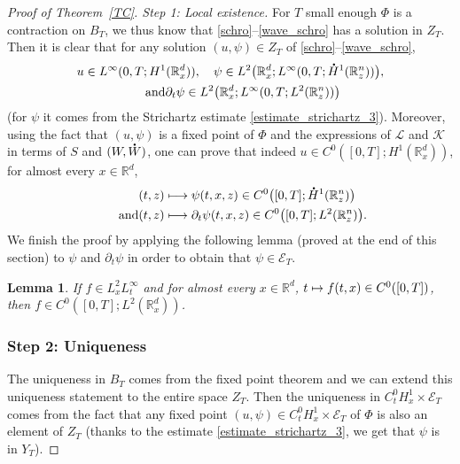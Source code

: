 \documentclass[10pt]{amsart}
\newcommand\mto{\mathchoice{\longmapsto}{\mapsto}{\mapsto}{\mapsto}}
\newtheorem{lemma}{Lemma}[section]
\theoremstyle{definition}
\newcommand*{\overbigdot}[1]{%
\accentset{\mbox{\large\bfseries .}}{#1}}
\newenvironment{ProofOf}[1]{\begin{proof}[Proof of #1]}{\end{proof}}
\newcommand{\R}{\mathbb{R}}
\begin{document}
\begin{ProofOf}{Theorem~\ref{TC}. Step 1: Local existence} For $T$ small enough $\Phi$ is a contraction on $B_{T}$, we thus know that \eqref{schro}--\eqref{wave_schro} has a solution in $Z_{T}$. Then it is clear that for any solution $(u,\psi)\in Z_{T}$ of \eqref{schro}--\eqref{wave_schro},
\begin{gather*}
u\in L^{\infty}(0,T;H^{1}(\R_{x}^{d})),\quad \psi\in L^{2}\bigl(\R_{x}^{d};L^{\infty}(0,T;\overbigdot{H}^{1}(\R_{z}^{n}))\bigr),\\
\tag*{and} \partial_{t}\psi\in L^{2}\bigl(\R_{x}^{d};L^{\infty}(0,T;L^{2}(\R_{z}^{n}))\bigr)
\end{gather*}
(for $\psi$ it comes from the Strichartz estimate \eqref{estimate_strichartz_3}). Moreover, using the fact that $(u,\psi)$ is a fixed point of $\Phi$ and the expressions of $\mathcal{L}$ and $\mathcal{K}$ in terms of $S$ and $(W,\overbigdot{W})$, one can prove that indeed $u\in C^{0}\left([0,T];H^{1}(\R_{x}^{d})\right)$, for almost every $x\in\R^{d}$,\vspace*{-3pt}
\begin{align*}
(t,z)&\mto \psi(t,x,z)\in C^{0}\bigl([0,T];\overbigdot{H}^{1}(\R_{z}^{n})\bigr)\\
\tag*{and}
(t,z)&\mto\partial_{t}\psi(t,x,z)\in C^{0}\bigl([0,T];L^{2}(\R_{z}^{n})\bigr).
\end{align*}
We finish the proof by applying the following lemma (proved at the end of this section) to $\psi$ and $\partial_{t}\psi$ in order to obtain that $\psi\in\mathcal{E}_{T}$.
\begin{lemma}\label{lemma_continuity}
If $f\in L_{x}^{2}L_{t}^{\infty}$ and for almost every $x\in\R^{d}$, $t\mto f(t,x)\in C^{0}([0,T])$, then $f\in C^{0}\left([0,T];L^{2}(\R_{x}^{d})\right)$.
\end{lemma}

\subsubsection*{Step 2: Uniqueness} The uniqueness in $B_{T}$ comes from the fixed point theorem and we can extend this uniqueness statement to the entire space $Z_{T}$. Then the uniqueness in $C_{t}^{0}H_{x}^{1}\times\mathcal{E}_{T}$ comes from the fact that any fixed point $(u,\psi)\in C_{t}^{0}H_{x}^{1}\times\mathcal{E}_{T}$ of $\Phi$ is also an element of $Z_{T}$ (thanks to the estimate \eqref{estimate_strichartz_3}, we get that $\psi$ is in $Y_{T}$).


\end{ProofOf}
\end{document}
